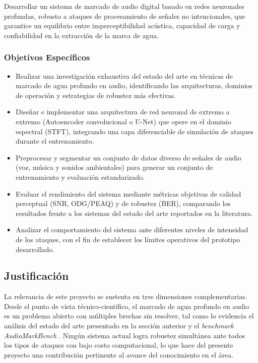 Desarrollar un sistema de marcado de audio digital basado en redes neuronales profundas, robusto a ataques de procesamiento de señales no intencionales, que garantice un equilibrio entre imperceptibilidad acústica, capacidad de carga y confiabilidad en la extracción de la marca de agua.

\subsubsection{Objetivos Específicos}
\label{subsec:objetivos_especificos}

\begin{itemize}
    \item Realizar una investigación exhaustiva del estado del arte en técnicas de marcado de agua profundo en audio, identificando las arquitecturas, dominios de operación y estrategias de robustez más efectivas.
    \item Diseñar e implementar una arquitectura de red neuronal de extremo a extremo (Autoencoder convolucional o U-Net) que opere en el dominio espectral (STFT), integrando una capa diferenciable de simulación de ataques durante el entrenamiento.
    \item Preprocesar y segmentar un conjunto de datos diverso de señales de audio (voz, música y sonidos ambientales) para generar un conjunto de entrenamiento y evaluación estandarizado.
    \item Evaluar el rendimiento del sistema mediante métricas objetivas de calidad perceptual (SNR, ODG/PEAQ) y de robustez (BER), comparando los resultados frente a los sistemas del estado del arte reportados en la literatura.
    \item Analizar el comportamiento del sistema ante diferentes niveles de intensidad de los ataques, con el fin de establecer los límites operativos del prototipo desarrollado.
\end{itemize}

\subsection{Justificación}
\label{sec:justificacion}

La relevancia de este proyecto se sustenta en tres dimensiones complementarias. Desde el punto de vista técnico-científico, el marcado de agua profundo en audio es un problema abierto con múltiples brechas sin resolver, tal como lo evidencia el análisis del estado del arte presentado en la sección anterior y el \textit{benchmark} \textit{AudioMarkBench} \cite{liu2024audiomarkbench}. Ningún sistema actual logra robustez simultánea ante todos los tipos de ataques con bajo costo computacional, lo que hace del presente proyecto una contribución pertinente al avance del conocimiento en el área.

